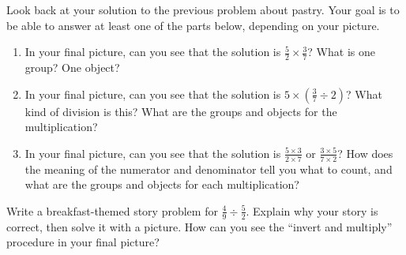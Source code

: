 \documentclass[nooutcomes,noauthor, handout]{ximera}
\begin{document}
\newpage

\begin{problem}
Look back at your solution to the previous problem about pastry. Your goal is to be able to answer at least one of the parts below, depending on your picture.
\begin{enumerate}
	\item In your final picture, can you see that the solution is $\frac{5}{2} \times \frac{3}{7}$? What is one group? One object?
	\item In your final picture, can you see that the solution is $5 \times \left ( \frac{3}{7} \div 2 \right )$? What kind of division is this? What are the groups and objects for the multiplication?
	\item In your final picture, can you see that the solution is $\frac{5 \times 3}{2 \times 7}$ or $\frac{3 \times 5}{7 \times 2}$? How does the meaning of the numerator and denominator tell you what to count, and what are the groups and objects for each multiplication?
\end{enumerate}
\end{problem}



\begin{problem}
Write a breakfast-themed story problem for $\frac{4}{9} \div \frac{5}{2}$. Explain why your story is correct, then solve it with a picture. How can you see the ``invert and multiply'' procedure in your final picture?
\end{problem}






\newpage
\end{document}
